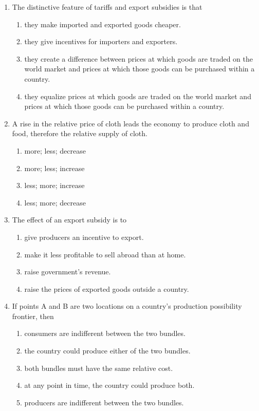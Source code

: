 \documentclass[12pt]{article}
\begin{document}
\begin{enumerate}[label=\textbf{\arabic*.}]
\item The distinctive feature of tariffs and export subsidies is that
\begin{enumerate}[label=\Alph*.]
\item they make imported and exported goods cheaper.
\item they give incentives for importers and exporters.
\item they create a difference between prices at which goods are traded on the world market and prices at which those goods can be purchased within a country.
\item they equalize prices at which goods are traded on the world market and prices at which those goods can be purchased within a country.
\end{enumerate}
\newpage
\item A rise in the relative price of cloth leads the economy to produce \underline{\hspace{2em}} cloth and \underline{\hspace{2em}} food, therefore \underline{\hspace{2em}} the relative supply of cloth.
\begin{enumerate}[label=\Alph*.]
\item more; less; decrease
\item more; less; increase
\item less; more; increase
\item less; more; decrease
\end{enumerate}

\item The effect of an export subsidy is to
\begin{enumerate}[label=\Alph*.]
\item give producers an incentive to export.
\item make it less profitable to sell abroad than at home.
\item raise government's revenue.
\item raise the prices of exported goods outside a country.
\end{enumerate}

\item If points A and B are two locations on a country's production possibility frontier, then
\begin{enumerate}[label=\Alph*.]
\item consumers are indifferent between the two bundles.
\item the country could produce either of the two bundles.
\item both bundles must have the same relative cost.
\item at any point in time, the country could produce both.
\item producers are indifferent between the two bundles.
\end{enumerate}


\end{enumerate}
\end{document}
